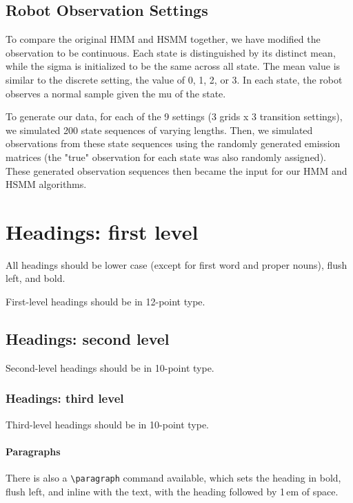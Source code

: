 \documentclass{article}
\begin{document}
\subsection{Robot Observation Settings}

To compare the original HMM and HSMM together, we have modified the observation to be continuous. Each state is distinguished by its distinct mean, while the sigma is initialized to be the same across all state. The mean value is similar to the discrete setting, the value of 0, 1, 2, or 3. In each state, the robot observes a normal sample given the mu of the state.

To generate our data, for each of the 9 settings (3 grids x 3 transition settings), we simulated 200 state sequences of varying lengths. Then, we simulated observations from these state sequences using the randomly generated emission matrices (the "true" observation for each state was also randomly assigned). These generated observation sequences then became the input for our HMM and HSMM algorithms.


\section{Headings: first level}
\label{headings}

All headings should be lower case (except for first word and proper nouns),
flush left, and bold.

First-level headings should be in 12-point type.

\subsection{Headings: second level}

Second-level headings should be in 10-point type.

\subsubsection{Headings: third level}

Third-level headings should be in 10-point type.

\paragraph{Paragraphs}

There is also a \verb+\paragraph+ command available, which sets the heading in
bold, flush left, and inline with the text, with the heading followed by 1\,em
of space.
\end{document}
